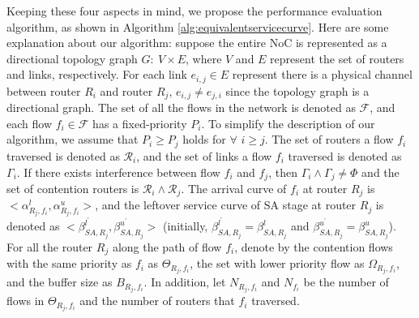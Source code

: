 \documentclass[10pt,journal]{IEEEtran}
\begin{document}
Keeping these four aspects in mind, we propose the performance evaluation algorithm, as shown in Algorithm \ref{alg:equivalentservicecurve}. Here are some explanation about our algorithm: suppose the entire NoC is represented as a directional topology graph $G:\ V\times E$, where $V$ and $E$ represent the set of routers and links, respectively. For each link $e_{i,j}\in E$ represent there is a physical channel between router $R_i$ and router $R_j$, $e_{i,j}\neq e_{j,i}$ since the topology graph is a directional graph. The set of all the flows in the network is denoted as $\mathcal{F}$, and each flow $f_i\in\mathcal{F}$ has a fixed-priority $P_i$. To simplify the description of our algorithm, we assume that $P_i\geq P_j$ holds for $\forall$ $i\geq j$. The set of routers a flow $f_i$ traversed is denoted as $\mathcal{R}_i$, and the set of links a flow $f_i$ traversed is denoted as $\Gamma_i$. If there exists interference between flow $f_i$ and $f_j$, then $\Gamma_i\wedge\Gamma_j\neq\Phi$ and the set of contention routers is $\mathcal{R}_i\wedge\mathcal{R}_j$. The arrival curve of $f_i$ at router $R_j$ is $<\alpha_{R_j,f_i}^l,\alpha_{R_j,f_i}^u>$, and the leftover service curve of SA stage at router $R_j$ is denoted as $<\beta_{SA,R_j}^{l^\prime},\beta_{SA,R_j}^{u^\prime}>$ (initially, $\beta_{SA,R_j}^{l^\prime}=\beta_{SA,R_j}^{l}$ and $\beta_{SA,R_j}^{u^\prime}=\beta_{SA,R_j}^{u}$). For all the router $R_j$ along the path of flow $f_i$, denote by the contention flows with the same priority as $f_i$ as $\Theta_{R_j,f_i}$, the set with lower priority flow as $\Omega_{R_j,f_i}$, and the buffer size as $B_{R_j,f_i}$. In addition, let $N_{R_j,f_i}$ and $N_{f_i}$ be the number of flows in $\Theta_{R_j,f_i}$ and the number of routers that $f_i$ traversed.
\end{document}
